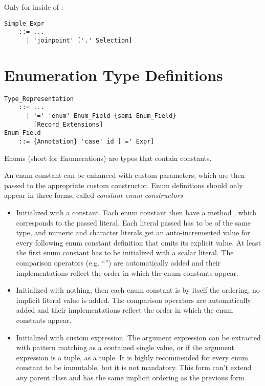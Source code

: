 Only for  inside of :
\begin{lstlisting}
Simple_Expr
    ::= ...
      | 'joinpoint' ['.' Selection]
\end{lstlisting}








\section{Enumeration Type Definitions}
\label{sec:enums}

\grammar\begin{lstlisting}
Type_Representation
    ::= ...
      | '=' 'enum' Enum_Field {semi Enum_Field}
        [Record_Extensions]
Enum_Field 
    ::= {Annotation} 'case' id ['=' Expr]
\end{lstlisting}

Enums (short for Enumerations) are types that contain constants.

An enum constant can be enhanced with custom parameters, which are then passed to the appropriate custom constructor. Enum definitions should only appear in three forms, called {\em constant enum constructors}
\begin{itemize}
  \item Initialized with a constant. Each enum constant then have a method , which corresponds to the passed literal. Each literal passed has to be of the same type, and numeric and character literals get an auto-incremented value for every following enum constant definition that omits its explicit value. At least the first enum constant has to be initialized with a scalar literal. The comparison operators (e.g. ``\code{<}'') are automatically added and their implementations reflect the order in which the enum constants appear.
  \item Initialized with nothing, then each enum constant is by itself the ordering, no implicit literal value is added. The comparison operators are automatically added and their implementations reflect the order in which the enum constants appear. 
  \item Initialized with custom expression. The argument expression can be extracted with pattern matching as a contained single value, or if the argument expression is a tuple, as a tuple. It is highly recommended for every enum constant to be immutable, but it is not mandatory. This form can't extend any parent class and has the same implicit ordering as the previous form. 
\end{itemize}





